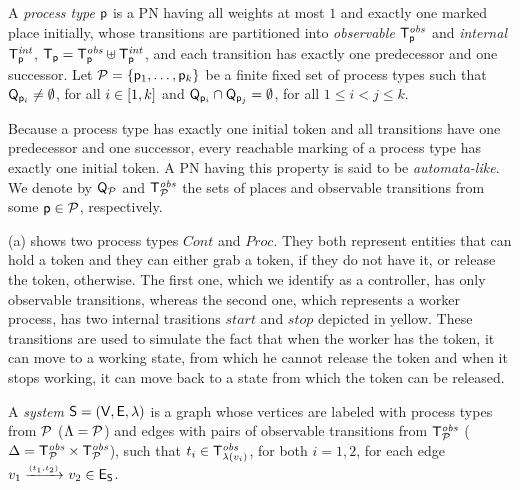 \begin{definition}\label{def:process-type}
  A \emph{process type} $\mathsf{p}$ is a PN having all weights at most
  $1$ and exactly one marked place initially, whose transitions are
  partitioned into \emph{observable} $\mathsf{T}^\mathit{obs}_{\mathsf{p}}$ and
  \emph{internal} $\mathsf{T}^\mathit{int}_{\mathsf{p}}$, \ie
  $\mathsf{T}_{\mathsf{p}}=\mathsf{T}^\mathit{obs}_{\mathsf{p}} \uplus \mathsf{T}^\mathit{int}_{\mathsf{p}}$,
  and each transition has exactly one predecessor and one
  successor. Let $\mathcal{P} = {\{ {\mathsf{p}_1, \ldots, \mathsf{p}_k} \}}$ be a
  finite fixed set of process types such that $\mathsf{Q}_{\mathsf{p}_i} \neq
  \emptyset$, for all $i \in {[{1},{k}]}$ and $\mathsf{Q}_{\mathsf{p}_i}
  \cap \mathsf{Q}_{\mathsf{p}_j} = \emptyset$, for all $1 \leq i < j \leq k$.
\end{definition}
Because a process type has exactly one initial token and all
transitions have one predecessor and one successor, every reachable
marking of a process type has exactly one initial token. A PN having
this property is said to be \emph{automata-like}. We denote by
$\mathsf{Q}_{\mathcal{P}}$ and $\mathsf{T}^\mathit{obs}_{\mathcal{P}}$ the sets of places and
observable transitions from some $\mathsf{p}\in\mathcal{P}$, respectively.



\begin{example}
   (a) shows two process types $\mathit{Cont}$
  and $\mathit{Proc}$. They both represent entities that can hold a
  token and they can either grab a token, if they do not have it, or
  release the token, otherwise. The first one, which we identify as a
  controller, has only observable transitions, whereas the second one,
  which represents a worker process, has two internal trasitions
  $\mathit{start}$ and $\mathit{stop}$ depicted in yellow. These
  transitions are used to simulate the fact that when the worker has
  the token, it can move to a working state, from which he cannot
  release the token and when it stops working, it can move back to a
  state from which the token can be released.
\end{example}

\begin{definition}\label{def:system}
  A \emph{system} $\mathsf{S}=(\mathsf{V},\mathsf{E},\lambda)$ is a graph whose
  vertices are labeled with process types from $\mathcal{P}$
  ($\Lambda=\mathcal{P}$) and edges with pairs of observable transitions
  from $\mathsf{T}^\mathit{obs}_{\mathcal{P}}$ (\ie
  $\Delta=\mathsf{T}^\mathit{obs}_{\mathcal{P}}\times\mathsf{T}^\mathit{obs}_{\mathcal{P}}$), such that
  $t_i \in \mathsf{T}^\mathit{obs}_{\lambda(v_i)}$, for both $i=1,2$, for each edge
  $v_1\xrightarrow{{\scriptscriptstyle (t_1,t_2)}}_{{\scriptscriptstyle }} v_2 \in \mathsf{E}_{\mathsf{S}}$.
\end{definition}

